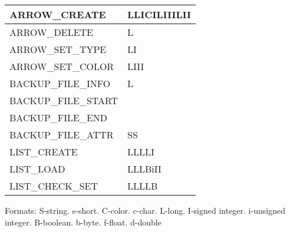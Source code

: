 \begin{table}[h]
\begin{tabular}{ | l | l | }
  ARROW\_CREATE & LLICILIIILII \\
  \hline
  ARROW\_DELETE & L \\
  \hline
  ARROW\_SET\_TYPE & LI \\
  \hline
  ARROW\_SET\_COLOR & LIII \\
  \hline


  BACKUP\_FILE\_INFO & L \\
  \hline
  BACKUP\_FILE\_START &  \\
  \hline
  BACKUP\_FILE\_END &  \\
  \hline
  BACKUP\_FILE\_ATTR & SS \\
  \hline

  LIST\_CREATE & LLLLI \\
  \hline
  LIST\_LOAD & LLLBiII \\
  \hline
  LIST\_CHECK\_SET & LLLLB \\
  \hline
  \end{tabular}
\end{table}

Formats:
S-string. s-short. C-color. c-char. L-long. I-signed integer. i-unsigned integer. B-boolean. b-byte. f-float. d-double
